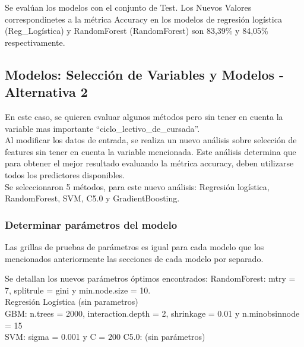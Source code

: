 Se evalúan los modelos con el conjunto de Test.
Los Nuevos Valores correspondinetes a la métrica Accuracy en los modelos de regresión logística (Reg\_Logística) y RandomForest (RandomForest) son 83,39\% y 84,05\% respectivamente. %

\subsection{Modelos: Selección de Variables y Modelos - Alternativa 2}

En este caso, se quieren evaluar algunos métodos pero sin tener en cuenta la variable mas importante ``ciclo\_lectivo\_de\_cursada''.\\
Al modificar los datos de entrada, se realiza un nuevo análisis sobre selección de features sin tener en cuenta la variable mencionada. Este análisis determina que para obtener el mejor resultado evaluando la métrica accuracy, deben utilizarse todos los predictores disponibles. \\


Se seleccionaron 5 métodos, para este nuevo análisis: Regresión logística, RandomForest, SVM, C5.0 y GradientBoosting.


\subsubsection{Determinar parámetros del modelo}

Las grillas de pruebas de parámetros es igual para cada modelo que los
mencionados anteriormente las secciones de cada modelo por separado.

Se detallan los nuevos parámetros óptimos encontrados: 
RandomForest: mtry = 7, splitrule = gini y min.node.size = 10.
\\
Regresión Logística (sin parametros)\\
GBM: n.trees = 2000, interaction.depth = 2, shrinkage = 0.01
y n.minobsinnode = 15\\
SVM: sigma = 0.001 y C = 200
C5.0: (sin parámetros)


